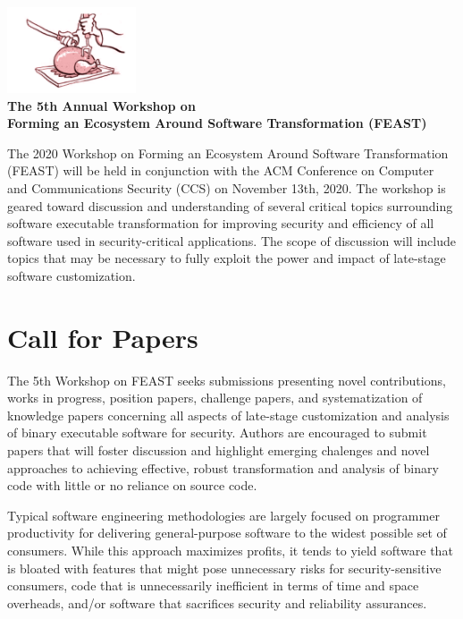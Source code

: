 \documentclass[10pt,letterpaper]{article}
\begin{document}
\begin{center}
\includegraphics[width=1.5in]{../../../images/logo.png} \\
{\large\bfseries The 5th Annual Workshop on} \\[5pt]
{\LARGE\bfseries Forming an Ecosystem Around Software Transformation (FEAST)}\par
\end{center}

The
2020
Workshop on Forming an Ecosystem Around Software Transformation (FEAST) will be held in conjunction with the ACM Conference on Computer and Communications Security (CCS) on
November 13th, 2020.
The workshop is geared toward discussion and understanding of several critical topics surrounding software executable transformation for improving security and efficiency of all software used in security-critical applications.
The scope of discussion will include topics that may be necessary to fully exploit the power and impact of late-stage software customization.

\section*{Call for Papers}

The 5th Workshop on FEAST
seeks submissions presenting novel contributions, works in progress, position papers, challenge papers, and systematization of knowledge papers
concerning all aspects of late-stage customization and analysis of binary executable software for security.
Authors are encouraged to submit papers that will foster discussion and highlight emerging chalenges and novel approaches to achieving effective, robust transformation and analysis of binary code with little or no reliance on source code.

Typical software engineering methodologies are largely focused on programmer productivity for delivering general-purpose software to the widest possible set of consumers.
While this approach maximizes profits, it tends to yield
software that is bloated with features that might pose unnecessary risks for security-sensitive consumers,
code that is unnecessarily inefficient in terms of time and space overheads,
and/or software that sacrifices security and reliability assurances.
\end{document}
